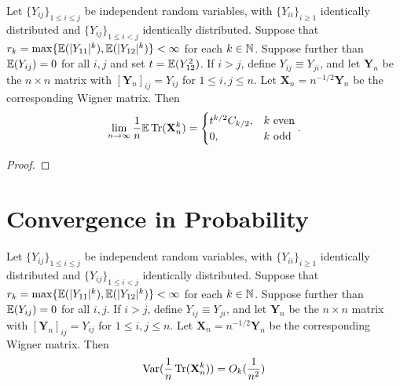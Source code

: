 \begin{proposition}
  \label{prop:matrix_moments_convergence}
  \notready
  Let $\{Y_{ij}\}_{1\le i\le j}$ be independent random variables, with $\{Y_{ii}\}_{i\ge 1}$ identically distributed and $\{Y_{ij}\}_{1\le i<j}$ identically distributed.  Suppose that $r_k = \max\{\mathbb{E}(|Y_{11}|^k),\mathbb{E}(|Y_{12}|^k)\} <\infty$ for each $k\in\mathbb{N}$.  Suppose further than $\mathbb{E}(Y_{ij})=0$ for all $i,j$ and set $t=\mathbb{E}(Y_{12}^2)$.  If $i>j$, define $Y_{ij} \equiv Y_{ji}$, and let $\mathbf{Y}_n$ be the $n\times n$ matrix with $[\mathbf{Y}_n]_{ij} = Y_{ij}$ for $1\le i,j\le n$.  Let $\mathbf{X}_n = n^{-1/2}\mathbf{Y}_n$ be the corresponding Wigner matrix.  Then
\[
\lim_{n\to\infty} \frac{1}{n}\mathbb{E}\operatorname{Tr}(\mathbf{X}_n^k) = \begin{cases}
  t^{k/2}C_{k/2}, & k\text{ even} \\
  0, & k\text{ odd}
\end{cases}.
\]
\end{proposition}

\begin{proof}
\notready
\end{proof}




\section{Convergence in Probability}

\begin{proposition}
  \label{prop:matrix_moments_convergence_probability}
  \notready
  Let $\{Y_{ij}\}_{1 \leq i \leq j}$ be independent random variables, with $\{Y_{ii}\}_{i\geq 1}$ identically distributed and $\{Y_{ij}\}_{1 \leq i < j}$ identically distributed. Suppose that $r_k = \max\{\mathbb{E}(|Y_{11}|^k),\mathbb{E}(|Y_{12}|^k)\} < \infty$ for each $k\in\mathbb{N}$. Suppose further than $\mathbb{E}(Y_{ij})=0$ for all $i,j$. If $i>j$, define $Y_{ij} \equiv Y_{ji}$, and let $\mathbf{Y}_n$ be the $n\times n$ matrix with $[\mathbf{Y}_n]_{ij} = Y_{ij}$ for $1\le i,j\le n$. Let $\mathbf{X}_n = n^{-1/2}\mathbf{Y}_n$ be the corresponding Wigner matrix. Then
  $$
  \operatorname{Var}(\frac{1}{n}\operatorname{Tr}(\mathbf{X}_{n}^{k})) = O_{k}(\frac{1}{n^2})
  $$ 
\end{proposition}
